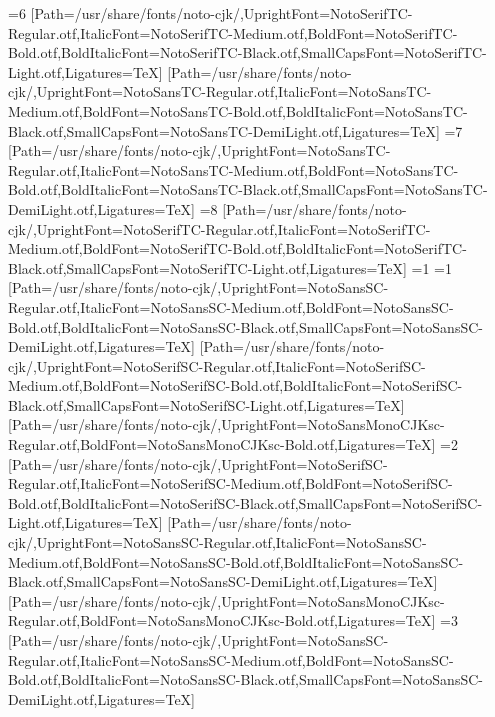 \else\ifnum\value{CJKFonts}=6
[Path=/usr/share/fonts/noto-cjk/,UprightFont=NotoSerifTC-Regular.otf,ItalicFont=NotoSerifTC-Medium.otf,BoldFont=NotoSerifTC-Bold.otf,BoldItalicFont=NotoSerifTC-Black.otf,SmallCapsFont=NotoSerifTC-Light.otf,Ligatures=TeX]
[Path=/usr/share/fonts/noto-cjk/,UprightFont=NotoSansTC-Regular.otf,ItalicFont=NotoSansTC-Medium.otf,BoldFont=NotoSansTC-Bold.otf,BoldItalicFont=NotoSansTC-Black.otf,SmallCapsFont=NotoSansTC-DemiLight.otf,Ligatures=TeX]
\else\ifnum\value{CJKFonts}=7
[Path=/usr/share/fonts/noto-cjk/,UprightFont=NotoSansTC-Regular.otf,ItalicFont=NotoSansTC-Medium.otf,BoldFont=NotoSansTC-Bold.otf,BoldItalicFont=NotoSansTC-Black.otf,SmallCapsFont=NotoSansTC-DemiLight.otf,Ligatures=TeX]
\else\ifnum\value{CJKFonts}=8
[Path=/usr/share/fonts/noto-cjk/,UprightFont=NotoSerifTC-Regular.otf,ItalicFont=NotoSerifTC-Medium.otf,BoldFont=NotoSerifTC-Bold.otf,BoldItalicFont=NotoSerifTC-Black.otf,SmallCapsFont=NotoSerifTC-Light.otf,Ligatures=TeX]
\fi\fi\fi\fi\fi\fi\fi\fi\else
\ifnum\value{CJKLanguage}=1
\ifnum\value{CJKFonts}=1
[Path=/usr/share/fonts/noto-cjk/,UprightFont=NotoSansSC-Regular.otf,ItalicFont=NotoSansSC-Medium.otf,BoldFont=NotoSansSC-Bold.otf,BoldItalicFont=NotoSansSC-Black.otf,SmallCapsFont=NotoSansSC-DemiLight.otf,Ligatures=TeX]
[Path=/usr/share/fonts/noto-cjk/,UprightFont=NotoSerifSC-Regular.otf,ItalicFont=NotoSerifSC-Medium.otf,BoldFont=NotoSerifSC-Bold.otf,BoldItalicFont=NotoSerifSC-Black.otf,SmallCapsFont=NotoSerifSC-Light.otf,Ligatures=TeX]
[Path=/usr/share/fonts/noto-cjk/,UprightFont=NotoSansMonoCJKsc-Regular.otf,BoldFont=NotoSansMonoCJKsc-Bold.otf,Ligatures=TeX]
\else\ifnum\value{CJKFonts}=2
[Path=/usr/share/fonts/noto-cjk/,UprightFont=NotoSerifSC-Regular.otf,ItalicFont=NotoSerifSC-Medium.otf,BoldFont=NotoSerifSC-Bold.otf,BoldItalicFont=NotoSerifSC-Black.otf,SmallCapsFont=NotoSerifSC-Light.otf,Ligatures=TeX]
[Path=/usr/share/fonts/noto-cjk/,UprightFont=NotoSansSC-Regular.otf,ItalicFont=NotoSansSC-Medium.otf,BoldFont=NotoSansSC-Bold.otf,BoldItalicFont=NotoSansSC-Black.otf,SmallCapsFont=NotoSansSC-DemiLight.otf,Ligatures=TeX]
[Path=/usr/share/fonts/noto-cjk/,UprightFont=NotoSansMonoCJKsc-Regular.otf,BoldFont=NotoSansMonoCJKsc-Bold.otf,Ligatures=TeX]
\else\ifnum\value{CJKFonts}=3
[Path=/usr/share/fonts/noto-cjk/,UprightFont=NotoSansSC-Regular.otf,ItalicFont=NotoSansSC-Medium.otf,BoldFont=NotoSansSC-Bold.otf,BoldItalicFont=NotoSansSC-Black.otf,SmallCapsFont=NotoSansSC-DemiLight.otf,Ligatures=TeX]
